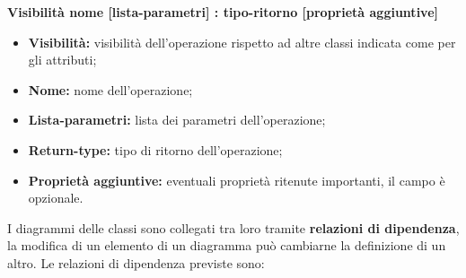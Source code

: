 \begin{itemize}
	\begin{center}
		\textbf{Visibilità nome [lista-parametri] : tipo-ritorno [proprietà aggiuntive]}
	\end{center}
	\begin{itemize}
		\item \textbf{Visibilità:} visibilità dell'operazione rispetto ad altre classi indicata come per gli attributi;
		\item \textbf{Nome:} nome dell'operazione;
		\item \textbf{Lista-parametri:} lista dei parametri dell'operazione; 
		\item \textbf{Return-type:} tipo di ritorno dell'operazione;
		\item \textbf{Proprietà aggiuntive:} eventuali proprietà ritenute importanti, il campo è opzionale.
	\end{itemize}
\end{itemize} 
\newpage \noindent I diagrammi delle classi sono collegati tra loro tramite \textbf{relazioni di dipendenza}, la modifica di un elemento di un diagramma può cambiarne la definizione di un altro.
Le relazioni di dipendenza previste sono:
